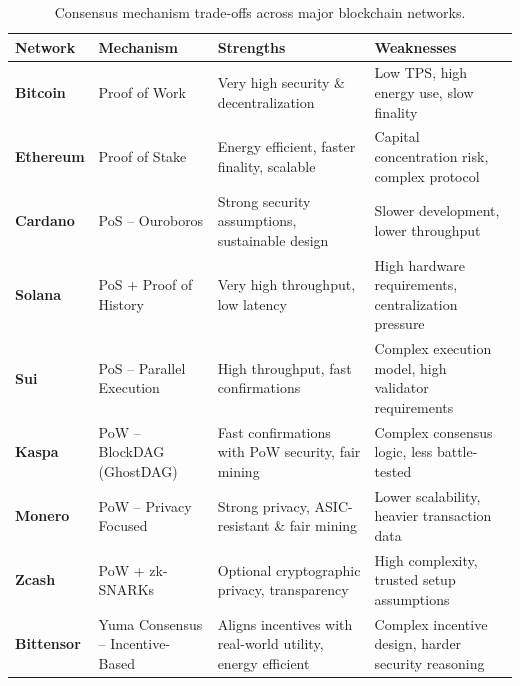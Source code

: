 \documentclass[12pt, a4paper, oneside]{report}
\theoremstyle{definition}
\begin{document}
\begin{table}[H]
\centering
\small
\renewcommand{\arraystretch}{1.6}
\begin{tabular}{p{2.8cm} p{3.2cm} p{4cm} p{4cm}}
\toprule
\textbf{Network} & \textbf{Mechanism} & \textbf{Strengths} & \textbf{Weaknesses} \\
\midrule

\textbf{Bitcoin} & Proof of Work &
Very high security \& decentralization &
Low TPS, high energy use, slow finality \\

\textbf{Ethereum} & Proof of Stake &
Energy efficient, faster finality, scalable &
Capital concentration risk, complex protocol \\

\textbf{Cardano} & PoS – Ouroboros &
Strong security assumptions, sustainable design &
Slower development, lower throughput \\

\textbf{Solana} & PoS + Proof of History &
Very high throughput, low latency &
High hardware requirements, centralization pressure \\

\textbf{Sui} & PoS – Parallel Execution &
High throughput, fast confirmations &
Complex execution model, high validator requirements \\

\textbf{Kaspa} & PoW – BlockDAG (GhostDAG) &
Fast confirmations with PoW security, fair mining &
Complex consensus logic, less battle-tested \\

\textbf{Monero} & PoW – Privacy Focused &
Strong privacy, ASIC-resistant \& fair mining &
Lower scalability, heavier transaction data \\

\textbf{Zcash} & PoW + zk-SNARKs &
Optional cryptographic privacy, transparency &
High complexity, trusted setup assumptions \\

\textbf{Bittensor} & Yuma Consensus – Incentive-Based &
Aligns incentives with real-world utility, energy efficient &
Complex incentive design, harder security reasoning \\

\bottomrule
\end{tabular}
\caption{Consensus mechanism trade-offs across major blockchain networks.}
\label{tab:consensus}
\end{table}
\end{document}
